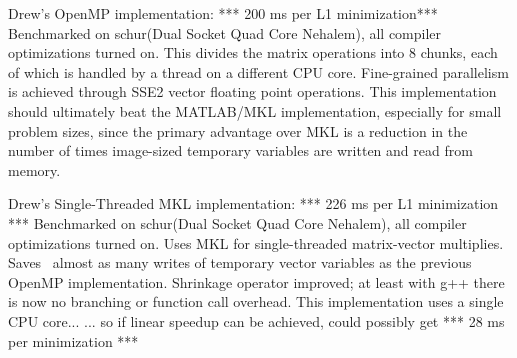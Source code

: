 \documentclass[10pt,twocolumn,letterpaper]{article}
\begin{document}
Drew's OpenMP implementation: *** 200 ms per L1 minimization***
Benchmarked on schur(Dual Socket Quad Core Nehalem), all compiler optimizations turned on.
This divides the matrix operations into 8 chunks, each of which is handled by a thread
on a different CPU core.  Fine-grained parallelism is achieved through SSE2 vector
floating point operations.  This implementation should ultimately beat the MATLAB/MKL
implementation, especially for small problem sizes, since the primary advantage
over MKL is a reduction in the number of times image-sized temporary variables
are written and read from memory. 

Drew's Single-Threaded MKL implementation: *** 226 ms per L1 minimization ***
Benchmarked on schur(Dual Socket Quad Core Nehalem), all compiler optimizations turned on.
Uses MKL for single-threaded matrix-vector multiplies.  
Saves ~almost as many writes of temporary vector variables as the previous OpenMP implementation.
Shrinkage operator improved; at least with g++ there is now no branching or function call overhead.
This implementation uses a single CPU core...
... so if linear speedup can be achieved, could possibly get *** 28 ms per minimization ***
\end{document}
